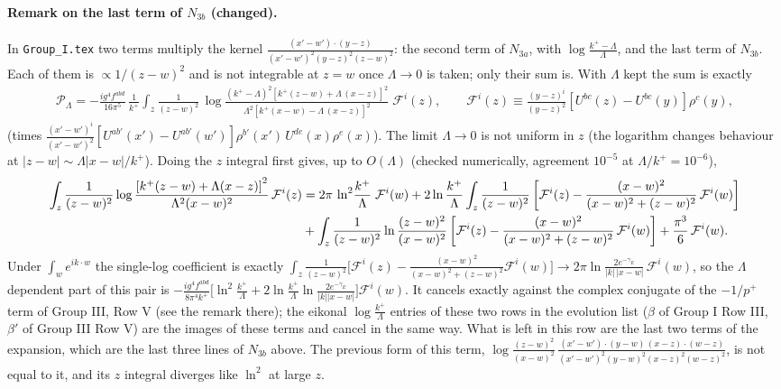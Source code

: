 \documentclass[9pt]{article}
\numberwithin{equation}{section}
\begin{document}
{\color{red}
\paragraph{Remark on the last term of $N_{3b}$ (changed).}
In \texttt{Group\_I.tex} two terms multiply the kernel $\frac{(x'-w')\cdot(y-z)}{(x'-w')^{2}(y-z)^{2}(z-w)^{2}}$: the second term of $N_{3a}$, with $\log\frac{k^{+}-\Lambda}{\Lambda}$, and the last term of $N_{3b}$. Each of them is $\propto 1/(z-w)^{2}$ and is not integrable at $z=w$ once $\Lambda\to0$ is taken; only their sum is. With $\Lambda$ kept the sum is exactly
\begin{align}
\mathcal{P}_{\Lambda}=-\frac{ig^{4}f^{abd}}{16\pi^{5}}\,\frac{1}{k^{+}}\int_{z}\frac{1}{(z-w)^{2}}\,\log\frac{(k^{+}-\Lambda)^{2}\left[k^{+}(z-w)+\Lambda\,(x-z)\right]^{2}}{\Lambda^{2}\left[k^{+}(x-w)-\Lambda\,(x-z)\right]^{2}}\;\mathcal{F}^{i}(z),\qquad
\mathcal{F}^{i}(z)\equiv\frac{(y-z)^{i}}{(y-z)^{2}}\left[U^{bc}(z)-U^{bc}(y)\right]\rho^{c}(y),
\end{align}
(times $\frac{(x'-w')^{i}}{(x'-w')^{2}}[U^{ab'}(x')-U^{ab'}(w')]\rho^{b'}(x')\,U^{de}(x)\rho^{e}(x)$). The limit $\Lambda\to0$ is not uniform in $z$ (the logarithm changes behaviour at $|z-w|\sim\Lambda|x-w|/k^{+}$). Doing the $z$ integral first gives, up to $O(\Lambda)$ (checked numerically, agreement $10^{-5}$ at $\Lambda/k^{+}=10^{-6}$),
\begin{align}
\int_{z}\frac{1}{(z-w)^{2}}\log\frac{\left[k^{+}(z-w)+\Lambda(x-z)\right]^{2}}{\Lambda^{2}(x-w)^{2}}\,\mathcal{F}^{i}(z)
&=2\pi\,\ln^{2}\!\frac{k^{+}}{\Lambda}\;\mathcal{F}^{i}(w)
+2\ln\frac{k^{+}}{\Lambda}\int_{z}\frac{1}{(z-w)^{2}}\left[\mathcal{F}^{i}(z)-\frac{(x-w)^{2}}{(x-w)^{2}+(z-w)^{2}}\,\mathcal{F}^{i}(w)\right]\notag\\
&+\int_{z}\frac{1}{(z-w)^{2}}\ln\frac{(z-w)^{2}}{(x-w)^{2}}\left[\mathcal{F}^{i}(z)-\frac{(x-w)^{2}}{(x-w)^{2}+(z-w)^{2}}\,\mathcal{F}^{i}(w)\right]+\frac{\pi^{3}}{6}\,\mathcal{F}^{i}(w).
\end{align}
Under $\int_{w}e^{ik\cdot w}$ the single-log coefficient is exactly $\int_{z}\frac{1}{(z-w)^{2}}\big[\mathcal{F}^{i}(z)-\frac{(x-w)^{2}}{(x-w)^{2}+(z-w)^{2}}\mathcal{F}^{i}(w)\big]\to 2\pi\ln\frac{2e^{-\gamma_{E}}}{|k|\,|x-w|}\,\mathcal{F}^{i}(w)$, so the $\Lambda$ dependent part of this pair is $-\frac{ig^{4}f^{abd}}{8\pi^{4}k^{+}}\big[\ln^{2}\frac{k^{+}}{\Lambda}+2\ln\frac{k^{+}}{\Lambda}\ln\frac{2e^{-\gamma_{E}}}{|k||x-w|}\big]\mathcal{F}^{i}(w)$. It cancels exactly against the complex conjugate of the $-1/p^{+}$ term of Group III, Row V (see the remark there); the eikonal $\log\frac{k^{+}}{\Lambda}$ entries of these two rows in the evolution list ($\beta$ of Group I Row III, $\beta'$ of Group III Row V) are the images of these terms and cancel in the same way. What is left in this row are the last two terms of the expansion, which are the last three lines of $N_{3b}$ above. The previous form of this term, $\log\frac{(z-w)^{2}}{(x-w)^{2}}\,\frac{(x'-w')\cdot(y-w)\,(x-z)\cdot(w-z)}{(x'-w')^{2}(y-w)^{2}(x-z)^{2}(w-z)^{2}}$, is not equal to it, and its $z$ integral diverges like $\ln^{2}$ at large $z$.
}
\end{document}
